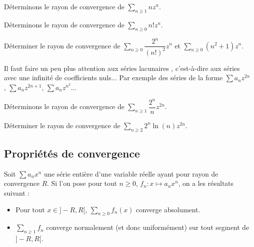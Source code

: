 \documentclass[french,11pt,twoside]{VcCours}
\begin{document}
%

\begin{Exemple}{} Déterminons le rayon de convergence de $\sum_{n \geq 1} n z^n$.

\vspace*{ 4cm}
\end{Exemple}

\begin{Exemple}{} Déterminons le rayon de convergence de $\sum_{n \geq 0} n! z^n$.

\vspace*{ 4cm}
\end{Exemple}

\begin{ApplicationDirecte}{} Déterminer le rayon de convergence de $\sum_{n \geq 0} \dfrac{2^n}{(n!)^2}z^n$ et $\sum_{n \geq 0} (n^2+1)z^n$.
\end{ApplicationDirecte}

\begin{Remarque}[\alerte]{} Il faut faire un peu plus attention aux séries \og{} lacunaires \fg, c'est-à-dire aux séries avec une infinité de coefficients nuls... Par exemple des séries de la forme $\sum a_n z^{2n}$, $\sum a_n z^{2n+1}$, $\sum a_n z^{n^2}$... 
%
\end{Remarque}

\begin{Exemple}{} Déterminons le rayon de convergence de $\sum_{n \geq 1} \dfrac{2^n}{n} z^{2n}$.

\vspace*{ 5.5cm}
\end{Exemple}

\begin{ApplicationDirecte}{} Déterminer le rayon de convergence de $\sum_{n \geq 2} 2^n \ln(n) z^{2n}$.
\end{ApplicationDirecte}

\subsection{Propriétés de convergence}
\begin{Proposition}{} Soit $\sum a_n x^n$ une série entière d'une variable réelle ayant pour rayon de convergence $R$. Si l'on pose pour tout $n \geq 0$, $f_n : x \mapsto a_n x^n$, on a les résultats suivant :
\begin{itemize}
\item Pour tout $x \in ]-R,R[$, $\sum_{n \geq 0} f_n(x)$ converge absolument.
\item $\sum_{n \geq 1} f_n$ converge normalement (et donc uniformément) sur tout segment de $]-R,R[$.
\end{itemize}
\end{Proposition}
\end{document}
